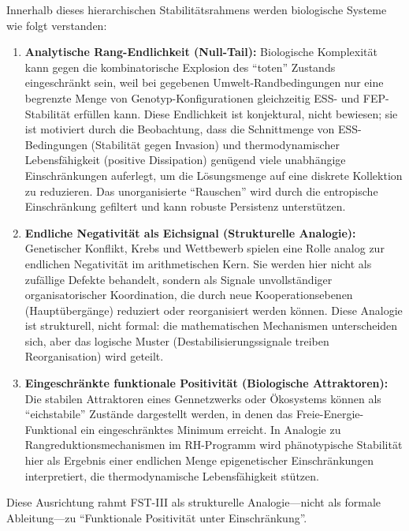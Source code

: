 \documentclass[12pt,a4paper]{article}
\theoremstyle{remark}
\begin{document}
Innerhalb dieses hierarchischen Stabilitätsrahmens werden biologische Systeme wie folgt verstanden:
\begin{enumerate}[label=\alph*)]
    \item \textbf{Analytische Rang-Endlichkeit (Null-Tail):} Biologische Komplexität kann gegen die kombinatorische Explosion des ``toten'' Zustands eingeschränkt sein, weil bei gegebenen Umwelt-Randbedingungen nur eine begrenzte Menge von Genotyp-Konfigurationen gleichzeitig ESS- und FEP-Stabilität erfüllen kann. Diese Endlichkeit ist konjektural, nicht bewiesen; sie ist motiviert durch die Beobachtung, dass die Schnittmenge von ESS-Bedingungen (Stabilität gegen Invasion) und thermodynamischer Lebensfähigkeit (positive Dissipation) genügend viele unabhängige Einschränkungen auferlegt, um die Lösungsmenge auf eine diskrete Kollektion zu reduzieren. Das unorganisierte ``Rauschen'' wird durch die entropische Einschränkung gefiltert und kann robuste Persistenz unterstützen.
    \item \textbf{Endliche Negativität als Eichsignal (Strukturelle Analogie):} Genetischer Konflikt, Krebs und Wettbewerb spielen eine Rolle analog zur endlichen Negativität im arithmetischen Kern. Sie werden hier nicht als zufällige Defekte behandelt, sondern als Signale unvollständiger organisatorischer Koordination, die durch neue Kooperationsebenen (Hauptübergänge) reduziert oder reorganisiert werden können. Diese Analogie ist strukturell, nicht formal: die mathematischen Mechanismen unterscheiden sich, aber das logische Muster (Destabilisierungssignale treiben Reorganisation) wird geteilt.
    \item \textbf{Eingeschränkte funktionale Positivität (Biologische Attraktoren):} Die stabilen Attraktoren eines Gennetzwerks oder Ökosystems können als ``eichstabile'' Zustände dargestellt werden, in denen das Freie-Energie-Funktional ein eingeschränktes Minimum erreicht. In Analogie zu Rangreduktionsmechanismen im RH-Programm wird phänotypische Stabilität hier als Ergebnis einer endlichen Menge epigenetischer Einschränkungen interpretiert, die thermodynamische Lebensfähigkeit stützen.
\end{enumerate}

Diese Ausrichtung rahmt FST-III als strukturelle Analogie---nicht als formale Ableitung---zu ``Funktionale Positivität unter Einschränkung''.
\end{document}
